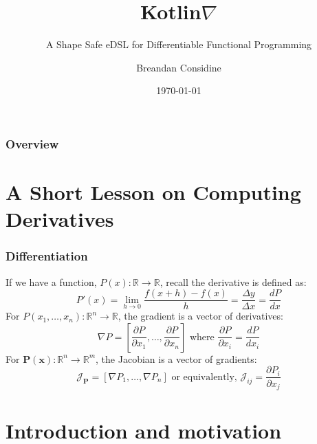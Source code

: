 \documentclass{beamer}
\title{Kotlin\texorpdfstring{$\nabla$}{}}
\subtitle{A Shape Safe eDSL for Differentiable Functional Programming}
\author{Breandan Considine}
\institute[McGill]{
McGill University \\
\medskip
\textit{breandan.considine@mcgill.ca}
}
\date{\today}
\begin{document}
    \begin{frame}
        \titlepage
    \end{frame}

    \begin{frame}
        \frametitle{Overview}
        \tableofcontents
    \end{frame}

    \section{A Short Lesson on Computing Derivatives}


    \begin{frame}
        \frametitle{Differentiation}
        If we have a function, $P(x): \mathbb{R}\rightarrow\mathbb{R}$, recall the derivative is defined as:
        \begin{equation}
            P'(x) = \lim _{h\to 0}{\frac {f(x+h)-f(x)}{h}} = \frac{\Delta y}{\Delta x} = \frac{dP}{dx}
        \end{equation}
        For $P(x_1, \dots, x_n): \mathbb{R}^n\rightarrow\mathbb{R}$, the gradient is a vector of derivatives:
        \begin{equation}
            \nabla P = \left[\frac{\partial P}{\partial x_1}, \dots, \dfrac{\partial P}{\partial x_n}\right]\text{ where }\frac{\partial P}{\partial x_i} = \frac{dP}{dx_i}
        \end{equation}
        For $\mathbf{P}(\mathbf{x}): \mathbb{R}^n\rightarrow\mathbb{R}^m$, the Jacobian is a vector of gradients:
        \begin{equation}
            \mathcal{J}_\mathbf{P} = \left[\nabla P_1, \dots, \nabla P_n \right] \text{ or equivalently, } \mathcal{J}_{ij} = \frac{\partial P_i}{\partial x_j}
        \end{equation}
    \end{frame}


    \section{Introduction and motivation}
\end{document}
